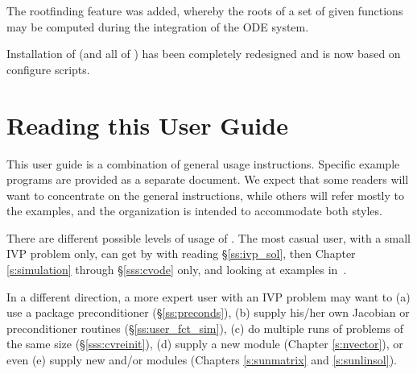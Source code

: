 The rootfinding feature was added, whereby the roots of a set of given
functions may be computed during the integration of the ODE system.

Installation of {\cvode} (and all of {\sundials}) has been completely 
redesigned and is now based on configure scripts.


\section{Reading this User Guide}\label{ss:reading}

This user guide is a combination of general usage instructions. 
Specific example programs are provided as a separate document.  
We expect that some readers will want to
concentrate on the general instructions, while others will refer
mostly to the examples, and the organization is intended to
accommodate both styles.

There are different possible levels of usage of {\cvode}. The most
casual user, with a small IVP problem only, can get by with reading
\S\ref{ss:ivp_sol}, then Chapter \ref{s:simulation} through
\S\ref{sss:cvode} only, and looking at examples in~\cite{cvode_ex}.

In a different direction, a more expert user with an IVP problem may want to
(a) use a package preconditioner (\S\ref{ss:preconds}), 
(b) supply his/her own Jacobian or preconditioner routines (\S\ref{ss:user_fct_sim}),
(c) do multiple runs of problems of the same size (\S\ref{sss:cvreinit}), 
(d) supply a new {\nvector} module (Chapter \ref{s:nvector}), or even 
(e) supply new {\sunlinsol} and/or {\sunmatrix} modules (Chapters
\ref{s:sunmatrix} and \ref{s:sunlinsol}).

